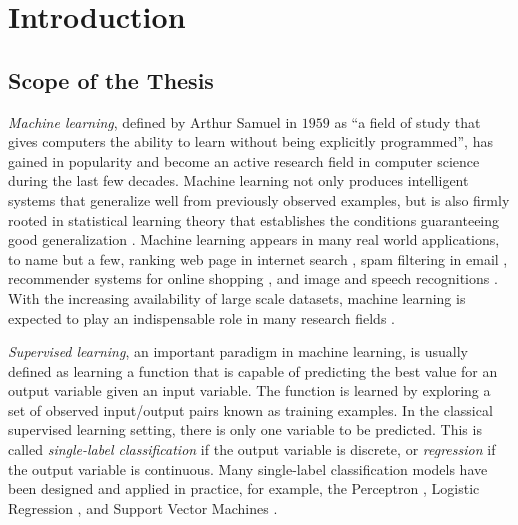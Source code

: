 




%
%
\chapter{Introduction}\label{ch_introduction}



%
%
\section{Scope of the Thesis}

\textit{Machine learning}, defined by Arthur Samuel in $1959$ as ``a field of study that gives computers the ability to learn without being explicitly programmed'', has gained in popularity and become an active research field in computer science during the last few decades.
Machine learning not only produces intelligent systems that generalize well from previously observed examples, but is also firmly rooted in statistical learning theory that establishes the conditions guaranteeing good generalization \citep{Vapnik98statistical,Vapnik99an}.
Machine learning appears in many real world applications, to name but a few, ranking web page in internet search \citep{Richardson06beyond}, spam filtering in email \citep{Goodman06online}, recommender systems for online shopping \citep{Bell07lessons}, and image and speech recognitions \citep{Bengio09learning}.
With the increasing availability of large scale datasets, machine learning is expected to play an indispensable role in many research fields \citep{Fan13mining}.

\textit{Supervised learning}, an important paradigm in machine learning, is usually defined as learning a function that is capable of predicting the best value for an output variable given an input variable.
The function is learned by exploring a set of observed input/output pairs known as training examples.
In the classical supervised learning setting, there is only one variable to be predicted.
This is called \textit{single-label classification} if the output variable is discrete, or \textit{regression} if the output variable is continuous.
Many single-label classification models have been designed and applied in practice, for example, the Perceptron \citep{Rosenblatt58}, Logistic Regression \citep{Chen99}, and Support Vector Machines \citep{Cortes95support}.

